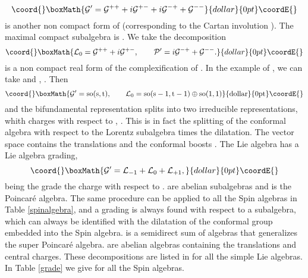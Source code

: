 \documentclass[a4paper,12pt]{article}
\begin{document}
$$\coord{}\boxMath{\g'=\g^{++}+i\g^{+-}+i\g^{-+}+\g^{--}}{dollar}{0pt}\coordE{}$$ is another non compact
form of \coordHE{} (corresponding to the Cartan involution
\coordHE{}). The maximal compact subalgebra is
\myHighlight{$\g^{++}+\g^{--}$}\coordHE{}. We take the decomposition
$$\coord{}\boxMath{\La_0=\g^{++}+i\g^{+-},\qquad \p'=i\g^{-+}+\g^{--}.}{dollar}{0pt}\coordE{}$$  \coordHE{} is
a non compact real form of the complexification of \myHighlight{$\ka$}\coordHE{}.
In the  example  of \coordHE{}, we can take
\coordHE{} and \coordHE{}, \coordHE{}. Then
$$\coord{}\boxMath{\g'=\rm{so}(s,t), \qquad
\La_0=\rm{so}(s-1,t-1)\oplus\rm{so}(1,1)}{dollar}{0pt}\coordE{}$$ and the bifundamental
 representation \coordHE{} splits into two irreducible
 representations, whith charges \coordHE{} with respect to
 \coordHE{}, \coordHE{}. This is in fact
 the splitting of the conformal algebra with respect to the
 Lorentz subalgebra times the dilatation. The vector space \coordHE{}
 contains the translations \coordHE{} and the conformal boosts
 \coordHE{}.
 The Lie algebra \coordHE{} has a Lie algebra grading,
$$\coord{}\boxMath{\g'=\La_{-1}+\La_0+\La_{+1},}{dollar}{0pt}\coordE{}$$
 being the grade the charge with respect to \coordHE{}.
 \coordHE{} are abelian subalgebras and \coordHE{} is the Poincar\'e algebra.
 The same procedure can be applied to all the Spin\coordHE{} algebras
 in  Table \ref{spinalgebra}, and a grading is always found with respect
 to a \coordHE{} subalgebra, which can always be identified
 with the dilatation of the conformal group embedded into the
 Spin\coordHE{} algebra. \coordHE{} is a semidirect sum of algebras that generalizes the super Poincar\'e
 algebra. \coordHE{} are abelian algebras containing the translations and central charges.
  These decompositions are listed in \cite{gi}
 for all the simple Lie algebras. In Table \ref{grade} we give
 \coordHE{} for all the Spin\coordHE{} algebras.
\end{document}
